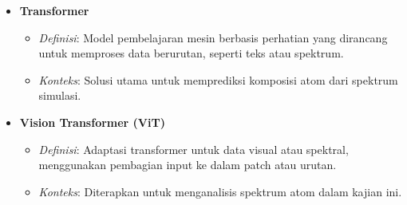 \documentclass[a4paper,12pt]{article}
\begin{document}
\begin{itemize}
    \item \textbf{Transformer}  
        \begin{itemize}
            \item \textit{Definisi}: Model pembelajaran mesin berbasis perhatian yang dirancang untuk memproses data berurutan, seperti teks atau spektrum.
            \item \textit{Konteks}: Solusi utama untuk memprediksi komposisi atom dari spektrum simulasi.
        \end{itemize}

    \item \textbf{Vision Transformer (ViT)}  
        \begin{itemize}
            \item \textit{Definisi}: Adaptasi transformer untuk data visual atau spektral, menggunakan pembagian input ke dalam patch atau urutan.
            \item \textit{Konteks}: Diterapkan untuk menganalisis spektrum atom dalam kajian ini.
        \end{itemize}
\end{itemize}
\end{document}
